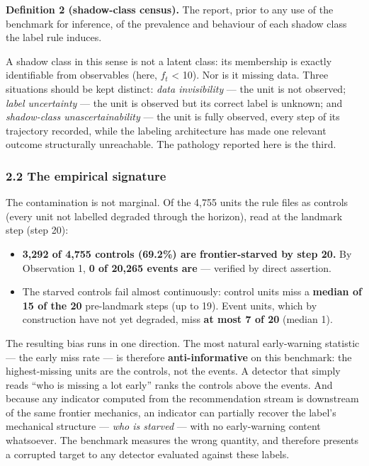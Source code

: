 \documentclass[
  11pt,
]{article}
\providecommand{\tightlist}{%
  \setlength{\itemsep}{0pt}\setlength{\parskip}{0pt}}
\begin{document}
\textbf{Definition 2 (shadow-class census).} The report, prior to any
use of the benchmark for inference, of the prevalence and behaviour of
each shadow class the label rule induces.

A shadow class in this sense is not a latent class: its membership is
exactly identifiable from observables (here, \(f_t\) \textless{} 10).
Nor is it missing data. Three situations should be kept distinct:
\emph{data invisibility} --- the unit is not observed; \emph{label
uncertainty} --- the unit is observed but its correct label is unknown;
and \emph{shadow-class unascertainability} --- the unit is fully
observed, every step of its trajectory recorded, while the labeling
architecture has made one relevant outcome structurally unreachable. The
pathology reported here is the third.

\subsubsection{2.2 The empirical
signature}\label{the-empirical-signature}

The contamination is not marginal. Of the 4,755 units the rule files as
controls (every unit not labelled degraded through the horizon), read at
the landmark step (step 20):

\begin{itemize}
\tightlist
\item
  \textbf{3,292 of 4,755 controls (69.2\%) are frontier-starved by step
  20.} By Observation 1, \textbf{0 of 20,265 events are} --- verified by
  direct assertion.
\item
  The starved controls fail almost continuously: control units miss a
  \textbf{median of 15 of the 20} pre-landmark steps (up to 19). Event
  units, which by construction have not yet degraded, miss \textbf{at
  most 7 of 20} (median 1).
\end{itemize}

The resulting bias runs in one direction. The most natural early-warning
statistic --- the early miss rate --- is therefore
\textbf{anti-informative} on this benchmark: the highest-missing units
are the controls, not the events. A detector that simply reads ``who is
missing a lot early'' ranks the controls above the events. And because
any indicator computed from the recommendation stream is downstream of
the same frontier mechanics, an indicator can partially recover the
label's mechanical structure --- \emph{who is starved} --- with no
early-warning content whatsoever. The benchmark measures the wrong
quantity, and therefore presents a corrupted target to any detector
evaluated against these labels.
\end{document}
